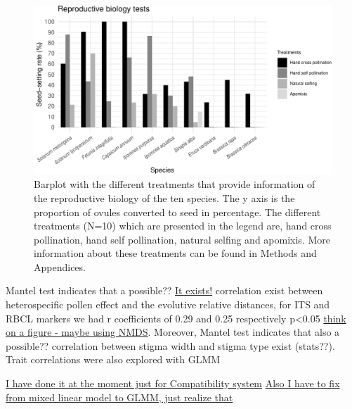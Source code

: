 \documentclass[11pt,a4paper]{article}
\begin{document}
\newpage

\begin{figure}
\centering
\includegraphics{output/figures/unnamed-chunk-3-1.pdf}
\caption{Barplot with the different treatments that provide information
of the reproductive biology of the ten species. The y axis is the
proportion of ovules converted to seed in percentage. The different
treatments (N=10) which are presented in the legend are, hand cross
pollination, hand self pollination, natural selfing and apomixis. More
information about these treatments can be found in Methods and
Appendices.}
\end{figure}

\newpage

Mantel test indicates that a possible?? \href{}{It exists!} correlation
exist between heterospecific pollen effect and the evolutive relative
distances, for ITS and RBCL markers we had r coefficients of 0.29 and
0.25 respectively p\textless{}0.05 \href{}{think on a figure - maybe
using NMDS}. Moreover, Mantel test indicates that also a possible??
correlation between stigma width and stigma type exist (stats??). Trait
correlations were also explored with GLMM

\href{Jose}{I have done it at the moment just for Compatibility system}
\href{Jose}{Also I have to fix from mixed linear model to GLMM, just
realize that}

\newpage
\end{document}
